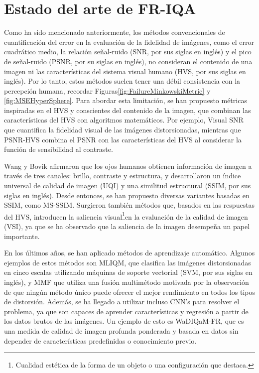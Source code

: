 \section{Estado del arte de FR-IQA}
Como ha sido mencionado anteriormente, los métodos convencionales de cuantificación del error en la evaluación de la fidelidad 
de imágenes, como el error cuadrático medio, la relación señal-ruido (SNR, por sus siglas en inglés) y el pico de señal-ruido (PSNR, por su siglas en inglés), 
no consideran el contenido de una imagen ni las características del sistema visual 
humano (HVS, por sus siglas en inglés). Por lo tanto, estos métodos suelen tener 
una débil consistencia con la percepción humana, recordar Figuras\ref{fig:FailureMinkowskiMetric} y \ref{fig:MSEHyperSphere}. 
Para abordar esta limitación, se han propuesto métricas inspiradas en el HVS y 
conscientes del contenido de la imagen, que combinan las características del HVS con algoritmos matemáticos. 
Por ejemplo, Visual SNR\cite{VSNR} que cuantifica la fidelidad visual de las imágenes 
distorsionadas, mientras que PSNR-HVS\cite{PSNR-HVS} combina el PSNR con las 
características del HVS al considerar la función de sensibilidad al contraste. 

Wang y Bovik afirmaron que los ojos humanos obtienen información de imagen a través de tres canales: brillo, contraste y estructura\cite{SSIM}, 
y desarrollaron un índice universal de calidad de imagen (UQI)\cite{UQI} y una similitud estructural (SSIM, por sus siglas en inglés)\cite{SSIM}.
Desde entonces, se han propuesto diversas variantes basadas en SSIM, como MS-SSIM\cite{MS-SSIM}.
Surgieron también métodos que, basados en las respuestas del HVS, introducen la 
saliencia visual\footnote{
  Cualidad estética de la forma de un objeto o una configuración que destaca.
}en la evaluación de la calidad de imagen (VSI)\cite{VSI}, 
ya que se ha observado que la saliencia de la imagen desempeña un papel importante.

En los últimos años, se han aplicado métodos de aprendizaje automático. 
Algunos ejemplos de estos métodos son MLIQM\cite{MLIQM}, que clasifica las imágenes distorsionadas en 
cinco escalas utilizando máquinas de soporte vectorial (SVM, por sus siglas en inglés), y MMF\cite{MMF} que utiliza 
una fusión multimétodo motivada por la observación de que ningún método único puede ofrecer 
el mejor rendimiento en todos los tipos de distorsión.
Además, se ha llegado a utilizar incluso CNN's para resolver el problema, ya que son capaces de aprender características 
y regresión a partir de los datos brutos de las imágenes. Un ejemplo de esto es 
WaDIQaM-FR\cite{DIQaM}, que es una medida de calidad de imagen profunda ponderada y 
basada en datos sin depender de características predefinidas o conocimiento previo.

